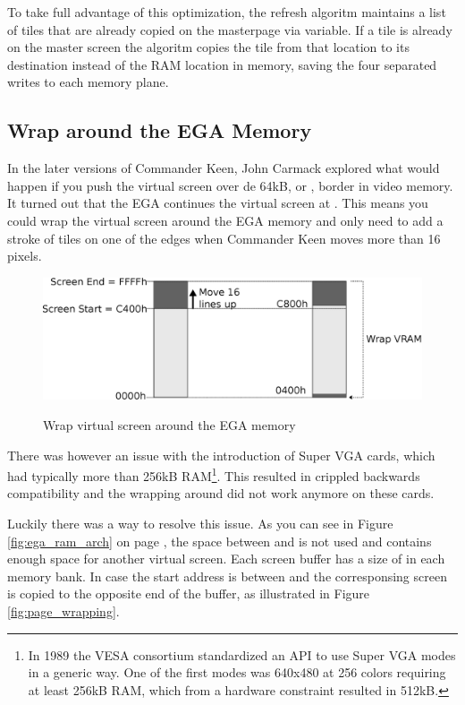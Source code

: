 \documentclass[book.tex]{subfiles}
\begin{document}
To take full advantage of this optimization, the refresh algoritm maintains a list of tiles that are already copied on the masterpage via  variable. If a tile is already on the master screen the algoritm copies the tile from that location to its destination instead of the RAM location in memory, saving the four separated writes to each memory plane.


\subsection{Wrap around the EGA Memory}
In the later versions of Commander Keen, John Carmack explored what would happen if you push the virtual screen over de 64kB, or , border in video memory. It turned out that the EGA continues the virtual screen at . This means you could wrap the virtual screen around  the EGA memory and only need to add a stroke of tiles on one of the edges when Commander Keen moves more than 16 pixels.\\
\par
\begin{figure}[H]
  \centering
  \includegraphics[width=\textwidth]{imgs/drawings/ega_wrapping.eps}
  \label{fig:ega_wrapping}
  \caption{Wrap virtual screen around the EGA memory}
\end{figure}
\par
There was however an issue with the introduction of Super VGA cards, which had typically more than 256kB RAM\footnote{In 1989 the VESA consortium standardized an API to use Super VGA modes in a generic way. One of the first modes was 640x480 at 256 colors requiring at least 256kB RAM, which from a hardware constraint resulted in 512kB.}. This resulted in crippled backwards compatibility and the wrapping around  did not work anymore on these cards. \\
\par
Luckily there was a way to resolve this issue. As you can see in Figure \ref{fig:ega_ram_arch} on page \pageref{fig:ega_ram_arch}, the space between  and  is not used and contains enough space for another virtual screen. Each screen buffer has a size of  in each memory bank. In case the start address is between  and  the corresponsing screen is copied to the opposite end of the buffer, as illustrated in Figure \ref{fig:page_wrapping}.\\
\end{document}
